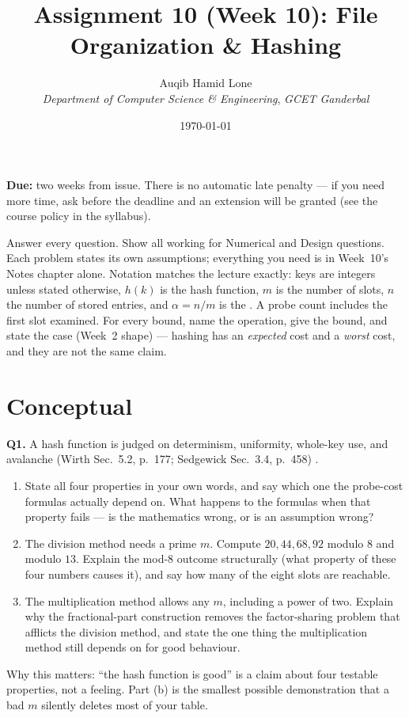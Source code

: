 \documentclass[11pt]{article}
\title{Assignment 10 (Week 10): File Organization \& Hashing}
\author{Auqib Hamid Lone\\[0.3em]
  \emph{Department of Computer Science \& Engineering}, \emph{GCET Ganderbal}}
\date{\today}
\begin{document}
\maketitle

\noindent\textbf{Due:} two weeks from issue. There is no automatic late penalty --- if you need more time, ask before the deadline and an extension will be granted (see the course policy in the syllabus).

\noindent Answer every question. Show all working for Numerical and Design questions. Each problem states its own assumptions; everything you need is in Week~10's Notes chapter alone. Notation matches the lecture exactly: keys are integers unless stated otherwise, $h(k)$ is the hash function, $m$ is the number of slots, $n$ the number of stored entries, and $\alpha = n/m$ is the . A probe count includes the first slot examined. For every bound, name the operation, give the bound, and state the case (Week~2 shape) --- hashing has an \emph{expected} cost and a \emph{worst} cost, and they are not the same claim.

\section{Conceptual}

\textbf{Q1.} A hash function is judged on determinism, uniformity, whole-key use, and avalanche (Wirth Sec.~5.2, p.~177; Sedgewick Sec.~3.4, p.~458) \cite{Wirth2004_algorithms_data_structures,Sedgewick2011_algorithms}.
\begin{enumerate}
  \item[(a)] State all four properties in your own words, and say which one the probe-cost formulas actually depend on. What happens to the formulas when that property fails --- is the mathematics wrong, or is an assumption wrong?
  \item[(b)] The division method needs a prime $m$. Compute $20, 44, 68, 92$ modulo $8$ and modulo $13$. Explain the mod-$8$ outcome structurally (what property of these four numbers causes it), and say how many of the eight slots are reachable.
  \item[(c)] The multiplication method allows any $m$, including a power of two. Explain why the fractional-part construction removes the factor-sharing problem that afflicts the division method, and state the one thing the multiplication method still depends on for good behaviour.
\end{enumerate}
Why this matters: ``the hash function is good'' is a claim about four testable properties, not a feeling. Part (b) is the smallest possible demonstration that a bad $m$ silently deletes most of your table.
\end{document}
